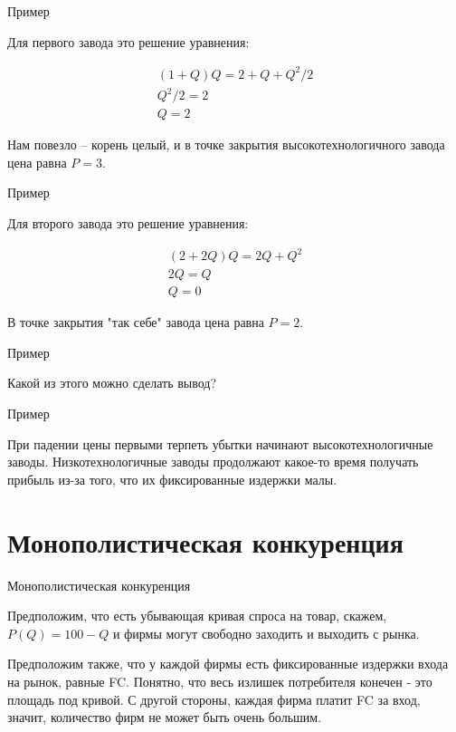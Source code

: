 \documentclass{beamer}
\begin{document}
\begin{frame}{Пример}
	
Для первого завода это решение уравнения:

\begin{gather*}
(1+Q) Q = 2 + Q + Q^2/2 \\
Q^2/2 = 2\\
Q = 2
\end{gather*}

Нам повезло – корень целый, и в точке закрытия высокотехнологичного завода цена равна $P=3$. 
	
\end{frame}

\begin{frame}{Пример}

Для второго завода это решение уравнения:

\begin{gather*}
(2+2Q) Q = 2Q + Q^2 \\
2Q = Q\\
Q = 0
\end{gather*}

В точке закрытия "так себе" завода цена равна $P=2$.
	
\end{frame}

\begin{frame}{Пример}

Какой из этого можно сделать вывод?
	
\end{frame}

\begin{frame}{Пример}

При падении цены первыми терпеть убытки начинают высокотехнологичные заводы. Низкотехнологичные заводы продолжают какое-то время получать прибыль из-за того, что их фиксированные издержки малы.
	
\end{frame}

\section{Монополистическая конкуренция}

\begin{frame}{Монополистическая конкуренция}

Предположим, что есть убывающая кривая спроса на товар, скажем, $P(Q) = 100 - Q$ и фирмы могут свободно заходить и выходить с рынка.

Предположим также, что у каждой фирмы есть фиксированные издержки входа на рынок, равные FC. Понятно, что весь излишек потребителя конечен - это площадь под кривой. С другой стороны, каждая фирма платит FC за вход, значит, количество фирм не может быть очень большим.
	
\end{frame}
\end{document}
